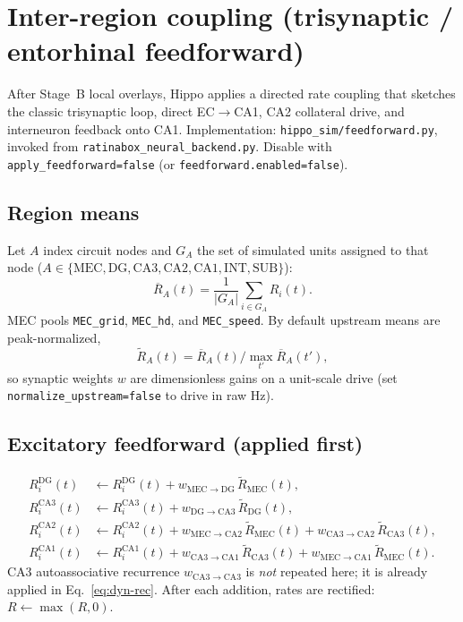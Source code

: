 \documentclass[11pt,a4paper]{article}
\begin{document}
\section{Inter-region coupling (trisynaptic / entorhinal feedforward)}
\label{sec:interregion}

After Stage~B local overlays, Hippo applies a directed rate coupling that sketches the classic trisynaptic loop, direct EC$\to$CA1, CA2 collateral drive, and interneuron feedback onto CA1.
Implementation: \texttt{hippo\_sim/feedforward.py}, invoked from \texttt{ratinabox\_neural\_backend.py}.
Disable with \texttt{apply\_feedforward=false} (or \texttt{feedforward.enabled=false}).

\subsection{Region means}
Let $A$ index circuit nodes and $G_A$ the set of simulated units assigned to that node
($A\in\{\mathrm{MEC},\mathrm{DG},\mathrm{CA3},\mathrm{CA2},\mathrm{CA1},\mathrm{INT},\mathrm{SUB}\}$):
\begin{equation}
  \overline{R}_{A}(t)
  =
  \frac{1}{|G_A|}\sum_{i\in G_A} R_i(t).
  \label{eq:region-mean}
\end{equation}
MEC pools \texttt{MEC\_grid}, \texttt{MEC\_hd}, and \texttt{MEC\_speed}.
By default upstream means are peak-normalized,
\begin{equation}
  \tilde R_A(t)=\overline{R}_A(t)/\max_{t'}\overline{R}_A(t'),
  \label{eq:region-norm}
\end{equation}
so synaptic weights $w$ are dimensionless gains on a unit-scale drive
(set \texttt{normalize\_upstream=false} to drive in raw Hz).

\subsection{Excitatory feedforward (applied first)}
\begin{align}
  R_i^{\mathrm{DG}}(t)
  &\leftarrow
  R_i^{\mathrm{DG}}(t)
  + w_{\mathrm{MEC}\to\mathrm{DG}}\,\tilde R_{\mathrm{MEC}}(t),
  \label{eq:ff-dg}\\
  R_i^{\mathrm{CA3}}(t)
  &\leftarrow
  R_i^{\mathrm{CA3}}(t)
  + w_{\mathrm{DG}\to\mathrm{CA3}}\,\tilde R_{\mathrm{DG}}(t),
  \label{eq:ff-ca3}\\
  R_i^{\mathrm{CA2}}(t)
  &\leftarrow
  R_i^{\mathrm{CA2}}(t)
  + w_{\mathrm{MEC}\to\mathrm{CA2}}\,\tilde R_{\mathrm{MEC}}(t)
  + w_{\mathrm{CA3}\to\mathrm{CA2}}\,\tilde R_{\mathrm{CA3}}(t),
  \label{eq:ff-ca2}\\
  R_i^{\mathrm{CA1}}(t)
  &\leftarrow
  R_i^{\mathrm{CA1}}(t)
  + w_{\mathrm{CA3}\to\mathrm{CA1}}\,\tilde R_{\mathrm{CA3}}(t)
  + w_{\mathrm{MEC}\to\mathrm{CA1}}\,\tilde R_{\mathrm{MEC}}(t).
  \label{eq:ff-ca1}
\end{align}
CA3 autoassociative recurrence $w_{\mathrm{CA3}\to\mathrm{CA3}}$ is \emph{not} repeated here; it is already applied in Eq.~\ref{eq:dyn-rec}.
After each addition, rates are rectified: $R\leftarrow\max(R,0)$.
\end{document}
